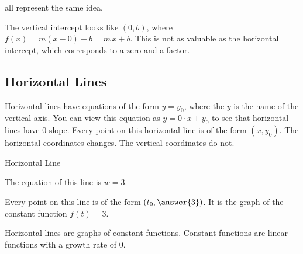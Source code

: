 \documentclass{ximera}
\begin{document}
all represent the same idea. 



The vertical intercept looks like $(0, b)$, where $f(x) = m(x-0)+b = m \, x + b$.  This is not as valuable as the horizontal intercept, which corresponds to a zero and a factor. 










\subsection*{Horizontal Lines} 

Horizontal lines have equations of the form $y = y_0$, where the $y$ is the name of the vertical axis. You can view this equation as $y = 0 \cdot x + y_0$ to see that horizontal lines have $0$ slope. Every point on this horizontal line is of the form $(x, y_0)$. The horizontal coordinates changes. The vertical coordinates do not.





\begin{example} Horizontal Line





The equation of this line is $w=3$.  

\begin{image}
\end{image}

Every point on this line is of the form $\left(t_0, \answer{3}\right)$. It is the graph of the constant function $f(t)=3$.


\end{example}
Horizontal lines are graphs of constant functions.  Constant functions are linear functions with a growth rate of $0$. 
\end{document}
